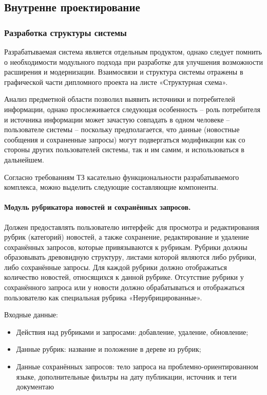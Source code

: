 \subsection{Внутренне проектирование}
\subsubsection{Разработка структуры системы}

Разрабатываемая система является отдельным продуктом, однако следует помнить о необходимости модульного подхода при разработке для улучшения возможности расширения и модернизации. Взаимосвязи и структура системы отражены в графической части дипломного проекта на листе «Структурная схема».


Анализ предметной области позволил выявить источники и потребителей информации, однако прослеживается следующая особенность -- роль потребителя и источника информации может зачастую совпадать в одном человеке -- пользователе системы -- поскольку предполагается, что данные (новостные сообщения и сохраненные запросы) могут подвергаться модификации как со стороны других пользователей системы, так и им самим, и использоваться в дальнейшем.

Согласно требованиям ТЗ касательно функциональности разрабатываемого комплекса, можно выделить следующие составляющие компоненты.

\paragraph{Модуль рубрикатора новостей и сохранённых запросов.}
Должен предоставлять пользователю интерфейс для просмотра и редактирования рубрик (категорий) новостей, а также сохранение, редактирование и удаление сохранённых запросов, которые привязываются к рубрикам. Рубрики должны образовывать древовидную структуру, листами которой являются либо рубрики, либо сохранённые запросы. Для каждой рубрики должно отображаться количество новостей, относящихся к данной рубрике. Отсутствие рубрики у сохранённого запроса или у новости должно обрабатываться и отображаться пользователю как специальная рубрика «Нерубрицированные».

Входные данные:
\begin{itemize}
\item Действия над рубриками и запросами: добавление, удаление, обновление;
\item Данные рубрик: название и положение в дереве из рубрик;
\item Данные сохранённых запросов: тело запроса на проблемно-ориентированном языке, дополнительные фильтры на дату публикации, источник и теги документаю
\end{itemize}

